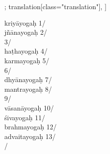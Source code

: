 \documentclass[12pt]{article}%
\def\om{\textrm{\foreignlanguage{english}{\footnotesize omitted in\ }}} %
\begin{document}
\begin{alignment}[
    texts=edition[class="edition"];
    translation[class="translation"],
    ]
    \begin{edition}
%
     \begin{prose}kriyāyogaḥ 1/\\ jñānayogaḥ 2/\\  3/\\ haṭhayogaḥ 4/\\ karmayogaḥ 5/\\  6/\\ dhyānayogaḥ 7/\\ mantrayogaḥ 8/\\  9/\\ vāsanāyogaḥ 10/\\ śivayogaḥ 11/\\ brahmayogaḥ 12/\\ advaitayogaḥ 13/\\ /\\ \\

\end{prose}
\end{edition}
\end{alignment}
\end{document}
